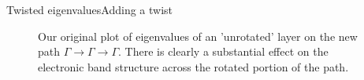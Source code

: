 \documentclass[9pt]{beamer}
\begin{document}
\begin{frame}{Twisted eigenvalues}{Adding a twist}
  \begin{figure}
  \centering
    \caption{Our original plot of eigenvalues of an 'unrotated' layer on the new path $\Gamma \rightarrow \Gamma \rightarrow \Gamma$. There is clearly a substantial effect on the electronic band structure across the rotated portion of the path.}
  \end{figure}
\end{frame}
\end{document}
